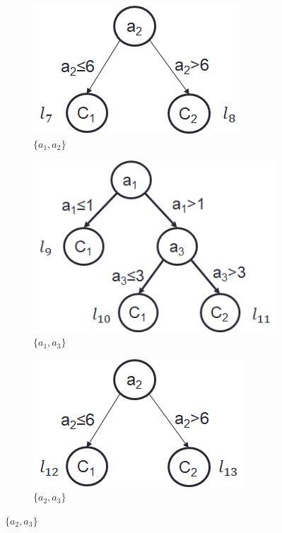 \documentclass[letterpaper]{article}
\theoremstyle{definition}
\begin{document}
\begin{figure}[!t]
	\vspace{5mm}
    \hspace{-10mm}
	\begin{subfigure}[t]{1in}\vskip 0pt
		\centering
		\caption{$\{a_1,a_2\}$}\label{fig:a1a2}
		\includegraphics[scale=0.4]{a1a2}
	\end{subfigure}
	\quad
	\begin{subfigure}[t]{1in}\vskip 0pt
		\centering
		\caption{$\{a_1,a_3\}$}\label{fig:a1a3}
		\includegraphics[scale=0.4]{a1a3}
	\end{subfigure}
	\quad
    \begin{subfigure}[t]{1in}\vskip 0pt
		\centering
		\caption{$\{a_2,a_3\}$}\label{fig:a2a3}
		\includegraphics[scale=0.4]{a2a3}
	\end{subfigure}
	\quad
    

\end{figure}
\end{document}
